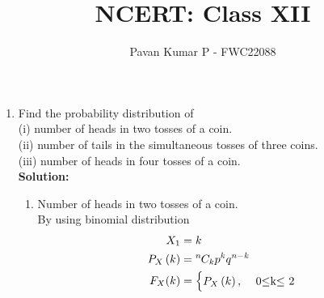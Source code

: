 \documentclass{article}
\providecommand{\brak}[1]{\ensuremath{\left(#1\right)}}
\newcommand{\solution}{\noindent \textbf{Solution: }}
\newcommand*{\permcomb}[4][0mu]{{{}^{#3}\mkern#1#2_{#4}}}
\newcommand*{\comb}[1][-1mu]{\permcomb[#1]{C}}
\begin{document}
\title{NCERT: Class XII}
\author{\Large Pavan Kumar P - FWC22088}
\date{}

\maketitle

\begin{enumerate}[label=13.\arabic{enumi}.\arabic{enumii}]

\setcounter{enumi}{3}
\setcounter{enumii}{4}

\item Find the probability distribution of\\
(i) number of heads in two tosses of a coin.\\
(ii) number of tails in the simultaneous tosses of three coins.\\
(iii) number of heads in four tosses of a coin.\\[1ex]
\solution
\begin{enumerate} 

\begin{table}[h]
 \centering
	
	\caption{Variable Description }
\end{table}
\item Number of heads in two tosses of a coin.\\
 By using binomial distribution
 \begin{align}
X_1 &= k\\ 
 P_X\brak{k} &= \comb{n}{k}p^{k}q^{n-k}\\
  F_X(k) &=
    \begin{cases}
      P_X\brak{k}, & \text{ 0$\leq$k$\leq$ 2}\\
    \end{cases}             
\end{align}


\end{enumerate}
\end{enumerate}
\end{document}
